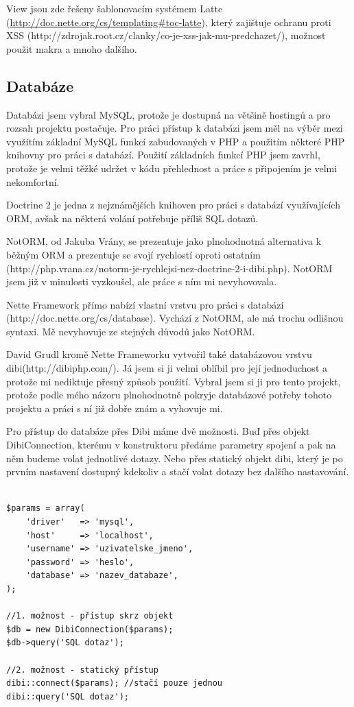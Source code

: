 \documentclass[thesis=B,czech]{FITthesis}[2011/06/14]
\begin{document}
View jsou zde řešeny šablonovacím systémem Latte (\url{http://doc.nette.org/cs/templating#toc-latte}), který zajištuje ochranu proti XSS (http://zdrojak.root.cz/clanky/co-je-xss-jak-mu-predchazet/), možnost použit makra a mnoho dalšího.

\subsection{Databáze}
Databázi jsem vybral MySQL, protože je dostupná na většině hostingů a pro rozsah projektu postačuje. Pro práci přístup k databázi jsem měl na výběr mezi využitím základní MySQL funkcí zabudovaných v PHP a použitím některé PHP knihovny pro práci s databází. Použití základních funkcí PHP jsem zavrhl, protože je velmi těžké udržet v kódu přehlednost a práce s připojením je velmi nekomfortní.

Doctrine 2 je jedna z nejznámějších knihoven pro práci s databází využívajících ORM, avšak na některá volání potřebuje příliš SQL dotazů.

NotORM, od Jakuba Vrány, se prezentuje jako plnohodnotná alternativa k běžným ORM a prezentuje se svojí rychlostí oproti ostatním (http://php.vrana.cz/notorm-je-rychlejsi-nez-doctrine-2-i-dibi.php). NotORM jsem již v minulosti vyzkoušel, ale práce s ním mi nevyhovovala. 

Nette Framework přímo nabízí vlastní vrstvu pro práci s databází (http://doc.nette.org/cs/database). Vychází z NotORM, ale má trochu odlišnou syntaxi. Mě nevyhovuje ze stejných důvodů jako NotORM.

David Grudl kromě Nette Frameworku vytvořil také databázovou vrstvu dibi(http://dibiphp.com/). Já jsem si ji velmi oblíbil pro její jednoduchost a protože mi nediktuje přesný způsob použití. Vybral jsem si ji pro tento projekt, protože podle mého názoru plnohodnotně pokryje databázové potřeby tohoto projektu a práci s ní již dobře znám a vyhovuje mi.

Pro přístup do databáze přes Dibi máme dvě možnosti. Buď přes objekt DibiConnection, kterému v konstruktoru předáme parametry spojení a pak na něm budeme volat jednotlivé dotazy. Nebo přes statický objekt dibi, který je po prvním nastavení dostupný kdekoliv a stačí volat dotazy bez dalšího nastavování.

\begin{verbatim}

$params = array(
    'driver'   => 'mysql',
    'host'     => 'localhost',
    'username' => 'uzivatelske_jmeno',
    'password' => 'heslo',
    'database' => 'nazev_databaze',
);

//1. možnost - přístup skrz objekt
$db = new DibiConnection($params);
$db->query('SQL dotaz');

//2. možnost - statický přístup
dibi::connect($params); //stačí pouze jednou
dibi::query('SQL dotaz');

\end{verbatim}
\end{document}
